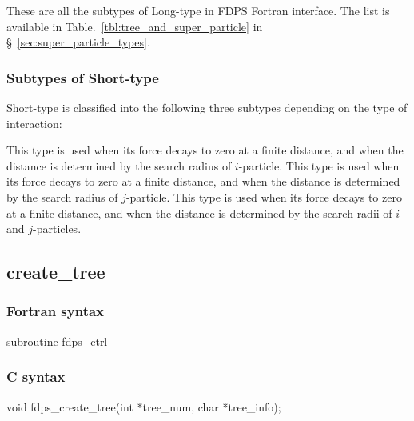 These are all the subtypes of Long-type in FDPS Fortran interface. The list is available in Table.~\ref{tbl:tree_and_super_particle} in \S~\ref{sec:super_particle_types}.


\subsubsection{Subtypes of Short-type}
\label{subsubsec:tree_kinds_short}
Short-type is classified into the following three subtypes depending on the type of interaction:
\begin{enumerate}[leftmargin=*]
 This type is used when its force decays to zero at a finite distance, and when the distance is determined by the search radius of $i$-particle.
 This type is used when its force decays to zero at a finite distance, and when the distance is determined by the search radius of $j$-particle.
 This type is used when its force decays to zero at a finite distance, and when the distance is determined by  the search radii of $i$- and $j$-particles.
\end{enumerate}


\clearpage

\subsection{create\_tree}
\subsubsection*{Fortran syntax}
\begin{screen}
\begin{spverbatim}
subroutine fdps_ctrl%
\end{spverbatim}
\end{screen}

\subsubsection*{C syntax}
\begin{screen}
\begin{spverbatim}
void fdps_create_tree(int *tree_num,                                                                
                      char *tree_info);
\end{spverbatim}
\end{screen}

